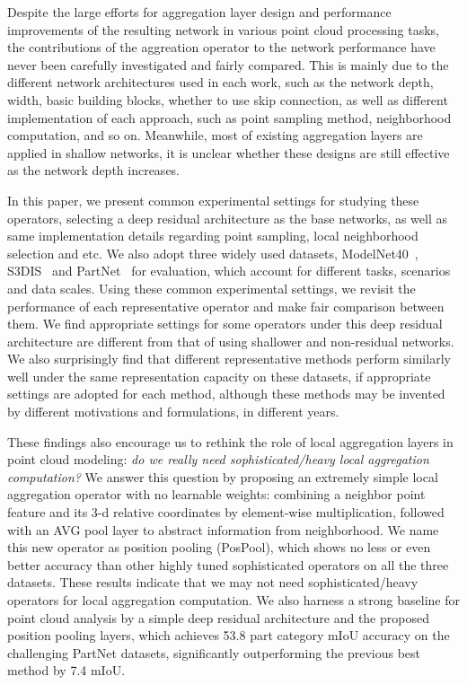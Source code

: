 \documentclass[runningheads]{llncs}
\begin{document}
Despite the large efforts for aggregation layer design and performance improvements of the resulting network in various point cloud processing tasks, the contributions of the aggreation operator to the network performance have never been carefully investigated and fairly compared. This is mainly due to the different network architectures used in each work, such as the network depth, width, basic building blocks, whether to use skip connection, as well as different implementation of each approach, such as point sampling method, neighborhood computation, and so on. Meanwhile, most of existing aggregation layers are applied in shallow networks, it is unclear whether these designs are still effective as the network depth increases.

In this paper, we present common experimental settings for studying these operators, selecting a deep residual architecture as the base networks, as well as same implementation details regarding point sampling, local neighborhood selection and etc. We also adopt three widely used datasets, ModelNet40~\cite{wu20153d}, S3DIS~\cite{2017arXiv170201105A} and PartNet~\cite{mo2019partnet} for evaluation, which account for different tasks, scenarios and data scales. Using these common experimental settings, we revisit the performance of each representative operator and make fair comparison between them. We find appropriate settings for some operators under this deep residual architecture are different from that of using shallower and non-residual networks. We also surprisingly find that different representative methods perform similarly well under the same representation capacity on these datasets, if appropriate settings are adopted for each method, although these methods may be invented by different motivations and formulations, in different years.

These findings also encourage us to rethink the role of local aggregation layers in point cloud modeling: \emph{do we really need sophisticated/heavy local aggregation computation?} We answer this question by proposing an extremely simple local aggregation operator with no learnable weights: combining a neighbor point feature and its 3-d relative coordinates by element-wise multiplication, followed with an AVG pool layer to abstract information from neighborhood. We name this new operator as position pooling (PosPool), which shows no less or even better accuracy than other highly tuned sophisticated operators on all the three datasets. These results indicate that we may not need sophisticated/heavy operators for local aggregation computation. We also harness a strong baseline for point cloud analysis by a simple deep residual architecture and the proposed position pooling layers, which achieves 53.8 part category mIoU accuracy on the challenging PartNet datasets, significantly outperforming the previous best method by 7.4 mIoU.
\end{document}
